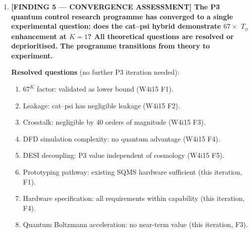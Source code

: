 \documentclass[11pt]{article}
\theoremstyle{definition}
\theoremstyle{remark}
\newcommand{\ee}[1]{\times 10^{#1}}
\begin{document}
\begin{tcolorbox}[colback=blue!5!white, colframe=blue!60!black,
  title=\textbf{W4i16 TOP 5 FINDINGS --- READ FIRST}]
\begin{enumerate}[nosep]
  The most demanding requirement is the modulation index accuracy
  $\delta\beta/\beta^* \leq 10^{-4}$.  This requires the AWG
  output to have $\geq 14$-bit resolution at 1\,MHz modulation
  rate.  Modern AWGs (Zurich Instruments HDAWG, Keysight M3202A)
  routinely achieve 16-bit resolution at $> 100$\,MHz sample rate,
  giving $\delta\beta/\beta^* \sim 2^{-16} \approx 1.5\ee{-5}$,
  well within specification.

  \textbf{Feedback requirement}: The modulation index must remain
  at $\beta^*$ to within $10^{-4}$ over the full measurement
  time ($\sim T_\phi^{(1)} \sim 1$\,s).  Slow drifts in the pump
  amplitude (thermal, power supply) must be compensated by a
  feedback loop.  Required feedback bandwidth:
  $f_{\rm FB} > 1/T_\phi^{(0)} \sim 100$\,Hz.  A PID loop sampling
  the pump amplitude via a directional coupler at 10\,kHz is
  sufficient.

  \textbf{Sideband rejection}: The JPA pump at $2\omega_{\rm cav}$
  modulated at $\omega_1$ produces sidebands at $2\omega_{\rm cav}
  \pm n\omega_1$.  The $n = 1$ sidebands at $2\omega_{\rm cav}
  \pm 1$\,MHz must not drive unwanted transitions in the cavity.
  Required rejection: $> 40$\,dB.  A standard microwave notch
  filter at the cavity input provides $> 60$\,dB rejection at 1\,MHz
  offset from the cavity resonance.

  \textbf{Conclusion}: All hardware requirements for the $K=1$
  psi-modulation demonstration are within existing SQMS capability.
  No exotic hardware development is needed.

\item \textbf{[FINDING 5 --- CONVERGENCE ASSESSMENT] The P3 quantum
  control research programme has converged to a single experimental
  question: does the cat--psi hybrid demonstrate $67\times$ $T_\phi$
  enhancement at $K=1$?  All theoretical questions are resolved or
  deprioritised.  The programme transitions from theory to experiment.}

  \textbf{Resolved questions} (no further P3 iteration needed):
  \begin{enumerate}[nosep]
    \item $67^K$ factor: validated as lower bound (W4i15 F1).
    \item Leakage: cat--psi has negligible leakage (W4i15 F2).
    \item Crosstalk: negligible by 40 orders of magnitude (W4i15 F3).
    \item DFD simulation complexity: no quantum advantage (W4i15 F4).
    \item DESI decoupling: P3 value independent of cosmology (W4i15 F5).
    \item Prototyping pathway: existing SQMS hardware sufficient (this
      iteration, F1).
    \item Hardware specification: all requirements within capability
      (this iteration, F4).
    \item Quantum Boltzmann acceleration: no near-term value (this
      iteration, F3).
  \end{enumerate}


\end{enumerate}
\end{tcolorbox}
\end{document}
